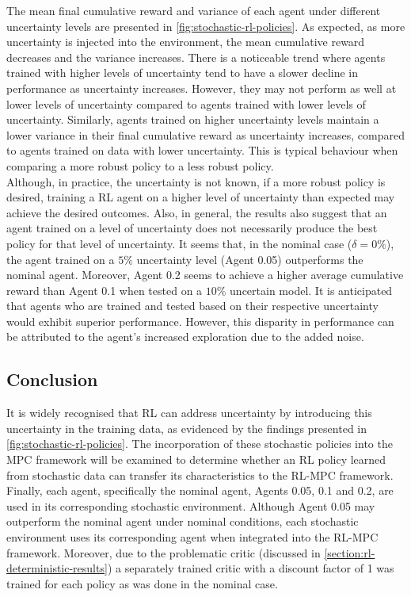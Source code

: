 The mean final cumulative reward and variance of each agent under different uncertainty levels are presented in \ref{fig:stochastic-rl-policies}. As expected, as more uncertainty is injected into the environment, the mean cumulative reward decreases and the variance increases. There is a noticeable trend where agents trained with higher levels of uncertainty tend to have a slower decline in performance as uncertainty increases. However, they may not perform as well at lower levels of uncertainty compared to agents trained with lower levels of uncertainty. Similarly, agents trained on higher uncertainty levels maintain a lower variance in their final cumulative reward as uncertainty increases, compared to agents trained on data with lower uncertainty. This is typical behaviour when comparing a more robust policy to a less robust policy.\\
Although, in practice, the uncertainty is not known, if a more robust policy is desired, training a RL agent on a higher level of uncertainty than expected may achieve the desired outcomes. Also, in general, the results also suggest that an agent trained on a level of uncertainty does not necessarily produce the best policy for that level of uncertainty. It seems that, in the nominal case ($\delta = 0\%$), the agent trained on a $5\%$ uncertainty level (Agent 0.05) outperforms the nominal agent. Moreover, Agent 0.2 seems to achieve a higher average cumulative reward than Agent 0.1 when tested on a $10\%$ uncertain model. It is anticipated that agents who are trained and tested based on their respective uncertainty would exhibit superior performance. However, this disparity in performance can be attributed to the agent’s increased exploration due to the added noise.

\subsection{Conclusion}
It is widely recognised that RL can address uncertainty by introducing this uncertainty in the training data, as evidenced by the findings presented in \autoref{fig:stochastic-rl-policies}. The incorporation of these stochastic policies into the MPC framework will be examined to determine whether an RL policy learned from stochastic data can transfer its characteristics to the RL-MPC framework. Finally, each agent, specifically the nominal agent, Agents 0.05, 0.1 and 0.2, are used in its corresponding stochastic environment. Although Agent 0.05 may outperform the nominal agent under nominal conditions, each stochastic environment uses its corresponding agent when integrated into the RL-MPC framework. Moreover, due to the problematic critic (discussed in \autoref{section:rl-deterministic-results}) a separately trained critic with a discount factor of 1 was trained for each policy as was done in the nominal case.

